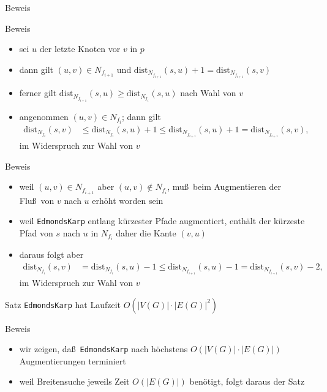 \documentclass[aspectratio=1610, 11pt]{beamer}
\newcommand\dist{\mathrm{dist}}
\begin{document}
\begin{frame}
\begin{overprint}
\begin{exampleblock}{Beweis}
		\end{exampleblock}
		\begin{exampleblock}{Beweis}
			\begin{itemize}
				\item sei $u$ der letzte Knoten vor $v$ in $p$
				\item dann gilt $(u,v)\in N_{f_{i+1}}$ und $\dist_{N_{f_{i+1}}}(s,u)+1=\dist_{N_{f_{i+1}}}(s,v)$
				\item ferner gilt $\dist_{N_{f_{i+1}}}(s,u)\geq\dist_{N_{f_{i}}}(s,u)$ nach Wahl von $v$
				\item angenommen $(u,v)\in N_{f_i}$; dann gilt
					\begin{align*}
						\dist_{N_{f_{i}}}(s,v)&\leq\dist_{N_{f_{i}}}(s,u)+1\leq\dist_{N_{f_{i+1}}}(s,u)+1=\dist_{N_{f_{i+1}}}(s,v),
					\end{align*}
					im Widerspruch zur Wahl von $v$
			\end{itemize}
		\end{exampleblock}
		\begin{exampleblock}{Beweis}
			\begin{itemize}
				\item weil $(u,v)\in N_{f_{i+1}}$ aber $(u,v)\not\in N_{f_i}$, mu\ss\ beim Augmentieren der Flu\ss\ von $v$ nach $u$ erh\"oht worden sein
				\item weil {\tt EdmondsKarp} entlang k\"urzester Pfade augmentiert, enth\"alt der k\"urzeste Pfad von $s$ nach $u$ in $N_{f_i}$ daher die Kante $(v,u)$
				\item daraus folgt aber
					\begin{align*}
						\dist_{N_{f_{i}}}(s,v)&=\dist_{N_{f_{i}}}(s,u)-1\leq\dist_{N_{f_{i+1}}}(s,u)-1=\dist_{N_{f_{i+1}}}(s,v)-2,
					\end{align*}
					im Widerspruch zur Wahl von $v$
			\end{itemize}
		\end{exampleblock}
		\begin{block}{Satz}
			{\tt EdmondsKarp} hat Laufzeit $O(|V(G)|\cdot|E(G)|^2)$
		\end{block}
		\begin{exampleblock}{Beweis}
			\begin{itemize}
				\item wir zeigen, da\ss\ {\tt EdmondsKarp} nach h\"ochstens $O(|V(G)|\cdot|E(G)|)$ Augmentierungen terminiert
				\item weil Breitensuche jeweils Zeit $O(|E(G)|)$ ben\"otigt, folgt daraus der Satz

\end{itemize}
\end{exampleblock}
\end{overprint}
\end{frame}
\end{document}
